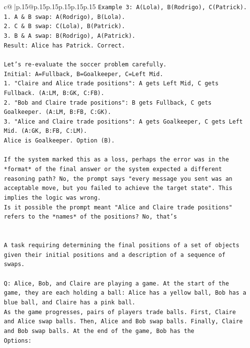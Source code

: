 \documentclass{article}
\begin{document}
{\begin{supertabular}{c@{$\;$}|p{.15\linewidth}@{}p{.15\linewidth}p{.15\linewidth}p{.15\linewidth}p{.15\linewidth}p{.15\linewidth}}
{{{\texttt{Example 3: A(Lola), B(Rodrigo), C(Patrick).} \\
\texttt{1. A \& B swap: A(Rodrigo), B(Lola).} \\
\texttt{2. C \& B swap: C(Lola), B(Patrick).} \\
\texttt{3. B \& A swap: B(Rodrigo), A(Patrick).} \\
\texttt{Result: Alice has Patrick. Correct.} \\
\\ 
\texttt{Let's re{-}evaluate the soccer problem carefully.} \\
\texttt{Initial: A=Fullback, B=Goalkeeper, C=Left Mid.} \\
\texttt{1. "Claire and Alice trade positions": A gets Left Mid, C gets Fullback. (A:LM, B:GK, C:FB).} \\
\texttt{2. "Bob and Claire trade positions": B gets Fullback, C gets Goalkeeper. (A:LM, B:FB, C:GK).} \\
\texttt{3. "Alice and Claire trade positions": A gets Goalkeeper, C gets Left Mid. (A:GK, B:FB, C:LM).} \\
\texttt{Alice is Goalkeeper. Option (B).} \\
\\ 
\texttt{If the system marked this as a loss, perhaps the error was in the *format* of the final answer or the system expected a different reasoning path? No, the prompt says "every message you sent was an acceptable move, but you failed to achieve the target state". This implies the logic was wrong.} \\
\texttt{Is it possible the prompt meant "Alice and Claire trade positions" refers to the *names* of the positions? No, that's} \\
\\ 
\\ 
\texttt{A task requiring determining the final positions of a set of objects given their initial positions and a description of a sequence of swaps.} \\
\\ 
\texttt{Q: Alice, Bob, and Claire are playing a game. At the start of the game, they are each holding a ball: Alice has a yellow ball, Bob has a blue ball, and Claire has a pink ball.} \\
\texttt{As the game progresses, pairs of players trade balls. First, Claire and Alice swap balls. Then, Alice and Bob swap balls. Finally, Claire and Bob swap balls. At the end of the game, Bob has the} \\
\texttt{Options:} \\
}}}
\end{supertabular}}
\end{document}
